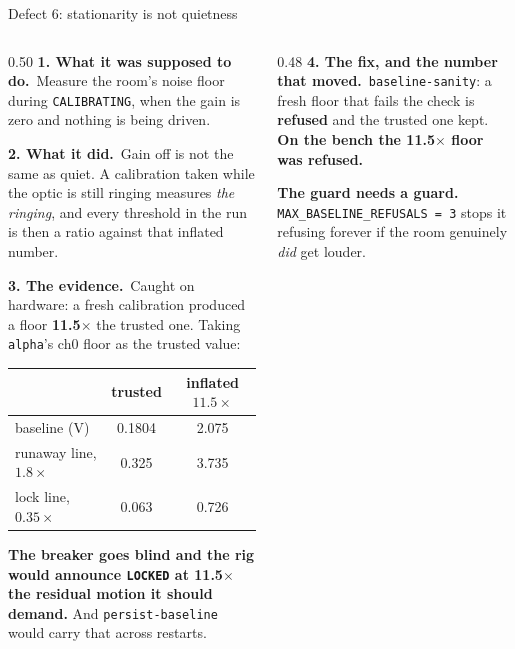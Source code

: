 \documentclass[aspectratio=169]{beamer}
\newcommand{\intended}{\textbf{1. What it was supposed to do.}}
\newcommand{\actual}{\textbf{2. What it did.}}
\newcommand{\evidence}{\textbf{3. The evidence.}}
\newcommand{\thefixn}{\textbf{4. The fix, and the number that moved.}}
\begin{document}
\begin{frame}{Defect 6: stationarity is not quietness}
  \begin{columns}[T]
    \begin{column}{0.50\textwidth}
      \footnotesize
      \intended\ Measure the room's noise floor during \texttt{CALIBRATING},
      when the gain is zero and nothing is being driven.

      \vspace{1.5mm}
      \actual\ Gain off is not the same as quiet. A calibration taken while the
      optic is still ringing measures \emph{the ringing}, and every threshold in
      the run is then a ratio against that inflated number.

      \vspace{1.5mm}
      \evidence\ Caught on hardware: a fresh calibration produced a floor
      \textbf{11.5$\times$} the trusted one. Taking \texttt{alpha}'s ch0 floor as
      the trusted value:

      \vspace{1mm}
      \centering
      {\scriptsize
      \begin{tabular}{@{}lcc@{}}
        \toprule
        & trusted & inflated $11.5\times$ \\
        \midrule
        baseline (V) & 0.1804 & 2.075 \\
        runaway line, $1.8\times$ & 0.325 & 3.735 \\
        lock line, $0.35\times$ & 0.063 & 0.726 \\
        \bottomrule
      \end{tabular}}

      \vspace{1.5mm}
      \raggedright
      \alert{\textbf{The breaker goes blind and the rig would announce
      \texttt{LOCKED} at 11.5$\times$ the residual motion it should demand.}} And
      \texttt{persist-baseline} would carry that across restarts.
    \end{column}
    \begin{column}{0.48\textwidth}
      \footnotesize
      \thefixn\ \texttt{baseline-sanity}: a fresh floor that fails the check is
      \textbf{refused} and the trusted one kept. \textbf{On the bench the
      11.5$\times$ floor was refused.}

      \vspace{2mm}
      \textbf{The guard needs a guard.}
      \texttt{MAX\_BASELINE\_REFUSALS = 3} stops it refusing forever if the room
      genuinely \emph{did} get louder.


\end{column}
\end{columns}
\end{frame}
\end{document}
